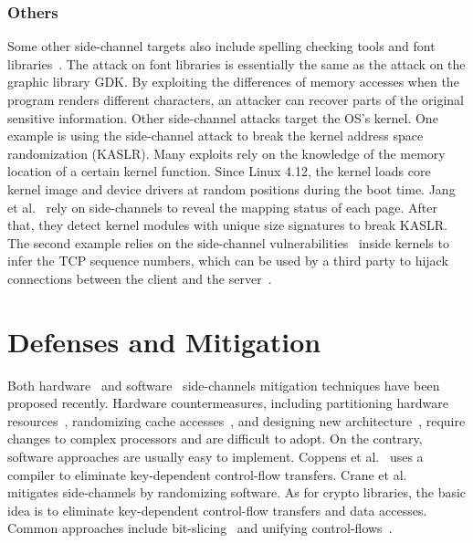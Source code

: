 \subsubsection*{Others}
Some other side-channel targets also include spelling checking tools and font libraries~\cite{xu2015controlled}. The attack on font libraries is essentially the same as the attack on the graphic library GDK. By exploiting the differences of memory accesses when the program renders different characters, an attacker can recover parts of the original sensitive information. Other side-channel attacks target the OS's kernel. One example is using the side-channel attack to break the kernel address space randomization (KASLR).
Many exploits rely on the knowledge of the memory location of a certain kernel function. Since Linux 4.12, the kernel loads core kernel image and device drivers at random positions during the boot time. Jang et al.~\cite{jang2016breaking} rely on side-channels to reveal the mapping status of each page. After that, they detect kernel modules with unique size signatures to break KASLR. The second example relies on the side-channel vulnerabilities~\cite{cao2019principled} inside kernels to infer the TCP sequence numbers, which can be used by a third party to hijack connections between the client and the server~\cite{cao2016off}.

\section{Defenses and Mitigation}

Both hardware~\cite{Page2005PartitionedCA,
    Wang:2007:NCD:1250662.1250723,Zhang:2015:HDL:2775054.2694372,Li:2014:SLH:2541940.2541947,
    236344, 236334} and software~\cite{shih2017t,Coppens:2009:PMT:1607723.1608124,
    brickell2006software,crane2015thwarting, 197207} side-channels mitigation techniques have
been proposed recently. Hardware countermeasures, including partitioning hardware resources~\cite{Page2005PartitionedCA}, randomizing cache
accesses~\cite{Wang:2007:NCD:1250662.1250723, 236344}, and designing new
architecture~\cite{tiwari2011crafting}, require changes to complex processors and are difficult to adopt. On the contrary, software approaches are
usually easy to implement. Coppens et
al.~\cite{Coppens:2009:PMT:1607723.1608124} uses a compiler
to eliminate key-dependent control-flow transfers. Crane et
al.~\cite{crane2015thwarting} mitigates side-channels by randomizing software.
As for crypto libraries, the basic idea is to eliminate key-dependent
control-flow transfers and data accesses. Common approaches include
bit-slicing~\cite{konighofer2008fast,rebeiro2006bitslice} and unifying
control-flows~\cite{Coppens:2009:PMT:1607723.1608124}.

